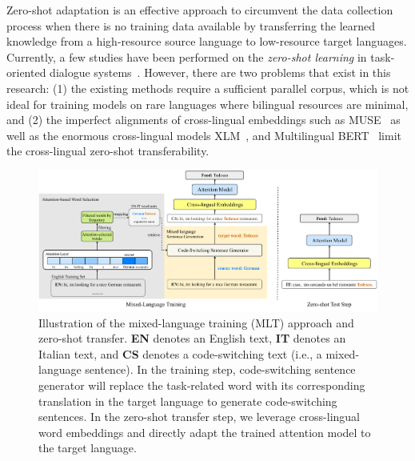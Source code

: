 \documentclass[letterpaper]{article} %
\begin{document}
Zero-shot adaptation is an effective approach to circumvent the data collection process when there is no training data available by transferring the learned knowledge from a high-resource source language to low-resource target languages. Currently, a few studies have been performed on the \textit{zero-shot learning} in task-oriented dialogue systems~\cite{chen2018xl,schuster2019cross}.
However, there are two problems that exist in this research:
(1) the existing methods require a sufficient parallel corpus, which is not ideal for training models on rare languages where bilingual resources are minimal, and (2) the imperfect alignments of cross-lingual embeddings such as MUSE~\cite{conneau2017word} as well as the enormous cross-lingual models XLM~\cite{lample2019cross}, and Multilingual BERT~\cite{devlin2019bert} limit the cross-lingual zero-shot transferability.


\begin{figure}[ht!]
    \centering
    \includegraphics[scale=0.82]{mixed_language_training.pdf}
    \caption{Illustration of the mixed-language training (MLT) approach and zero-shot transfer. \textbf{EN} denotes an English text, \textbf{IT} denotes an Italian text, and \textbf{CS} denotes a code-switching text (i.e., a mixed-language sentence). In the training step, code-switching sentence generator will replace the task-related word with its corresponding translation in the target language to generate code-switching sentences. In the zero-shot transfer step, we leverage cross-lingual word embeddings and directly adapt the trained attention model to the target language.}
    \label{fig:MLT}
\end{figure}
\end{document}
